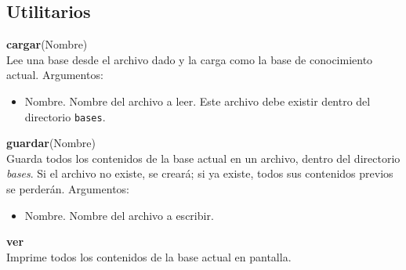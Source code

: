 \documentclass[11pt]{article}
\newcommand{\comando}[2]{
    \textbf{#1}(#2)\\
}
\newenvironment{args}{
    \newline
    Argumentos:
    \begin{itemize}
}{
    \end{itemize}
    \bigskip
}
\begin{document}
\subsection{Utilitarios}

\comando{cargar}{Nombre}
Lee una base desde el archivo dado y la carga como la base de conocimiento actual.
\begin{args}
    \item Nombre. Nombre del archivo a leer. Este archivo debe existir dentro del directorio \texttt{bases}.
\end{args}

\comando{guardar}{Nombre}
Guarda todos los contenidos de la base actual en un archivo, dentro del directorio \textit{bases}. Si el archivo no existe, se creará; si ya existe, todos sus contenidos previos se perderán.
\begin{args}
    \item Nombre. Nombre del archivo a escribir.
\end{args}

\textbf{ver}\\
Imprime todos los contenidos de la base actual en pantalla.
\end{document}
